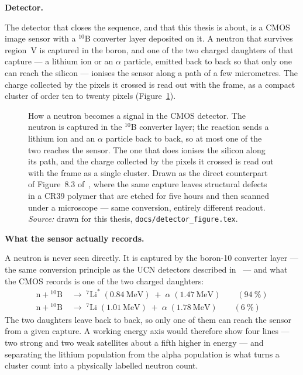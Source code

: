 \documentclass[a4paper,headsepline,oneside,11pt]{scrartcl}
\newcommand{\figsource}[1]{\\[3pt]{\footnotesize\emph{Source:} #1}}
\begin{document}
\vspace{0.5em}
\textbf{Detector.}

The detector that closes the sequence, and that this thesis is about, is a
CMOS image sensor with a $^{10}$B converter layer deposited on it. A neutron
that survives region~V is captured in the boron, and one of the two charged
daughters of that capture --- a lithium ion or an $\alpha$ particle, emitted back
to back so that only one can reach the silicon --- ionises the sensor along a
path of a few micrometres. The charge collected by the pixels it crossed is read
out with the frame, as a compact cluster of order ten to twenty pixels
(Figure~\ref{fig:detector_cmos}).

\begin{figure}[htbp]
  \centering
  \resizebox{0.58\textwidth}{!}{\qbDetectorCMOS}
  \caption{How a neutron becomes a signal in the CMOS detector. The neutron
  is captured in the $^{10}$B converter layer; the reaction sends a lithium
  ion and an $\alpha$ particle back to back, so at most one of the two reaches
  the sensor. The one that does ionises the silicon along its path, and the
  charge collected by the pixels it crossed is read out with the frame as a
  single cluster. Drawn as the direct counterpart of Figure~8.3
  of~\cite{Filter2018}, where the same capture leaves structural defects in a
  CR39 polymer that are etched for five hours and then scanned under a
  microscope --- same conversion, entirely different readout.\figsource{drawn for this thesis, \texttt{docs/detector\_figure.tex}.}}
  \label{fig:detector_cmos}
\end{figure}

\vspace{0.5em}
\textbf{What the sensor actually records.}

A neutron is never seen directly. It is captured by the boron-10 converter
layer --- the same conversion principle as the UCN detectors described
in~\cite{Jenke2013detectors} --- and what the CMOS records is one of the two charged
daughters:
%
\begin{align}
  \mathrm{n} + {}^{10}\mathrm{B} &\;\longrightarrow\;
    {}^{7}\mathrm{Li}^{*} \;(\SI{0.84}{\mega\electronvolt})
    \;+\; \alpha \;(\SI{1.47}{\mega\electronvolt})
    \qquad (\SI{94}{\percent}) \label{eq:b10-excited}\\[2pt]
  \mathrm{n} + {}^{10}\mathrm{B} &\;\longrightarrow\;
    {}^{7}\mathrm{Li} \;(\SI{1.01}{\mega\electronvolt})
    \;+\; \alpha \;(\SI{1.78}{\mega\electronvolt})
    \qquad (\SI{6}{\percent}) \label{eq:b10-ground}
\end{align}
%
The two daughters leave back to back, so only one of them can reach the sensor
from a given capture. A working energy axis would therefore show four lines ---
two strong and two weak satellites about a fifth higher in energy --- and separating the
lithium population from the alpha population is what turns a cluster count into
a physically labelled neutron count.
\end{document}
